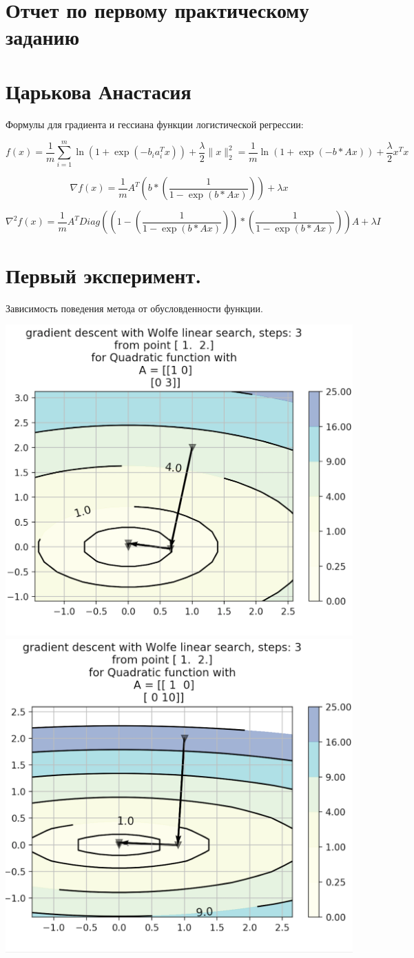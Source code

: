 \documentclass{article}
\theoremstyle{definition}
\theoremstyle{remark}
\newcommand{\lfrac} [2] {\displaystyle \frac{#1}{#2}}
\begin{document}
\section*{Отчет по первому практическому заданию}
\section*{Царькова Анастасия}

Формулы для градиента и гессиана функции логистической регрессии:

$$
f(x) = \lfrac{1}{m} \sum_{i = 1}^m \ln(1 + \exp(-b_ia_i^Tx)) + \lfrac{\lambda}{2} \|x\|_2^2 = \lfrac{1}{m} \ln(1 + \exp(-b * Ax)) + \lfrac{\lambda}{2} x^Tx
$$

$$
\nabla f(x) = \lfrac{1}{m} A^T \left(b * \left(\lfrac{1}{1 - \exp(b * Ax)} \right)\right) + \lambda x
$$

$$
\nabla^2 f(x) = \lfrac{1}{m} A^T Diag\left(\left(1 - \left(\lfrac{1}{1 - \exp(b * Ax)} \right)\right) * \left(\lfrac{1}{1 - \exp(b * Ax)} \right)\right)A + \lambda I
$$


\section{Первый эксперимент.}

Зависимость поведения метода от обусловденности функции.

\includegraphics[width=0.5 \textwidth]{11.png}
\includegraphics[width=0.5 \textwidth]{12.png}
\end{document}
